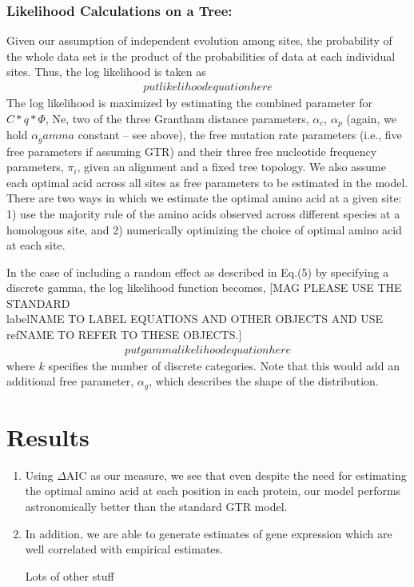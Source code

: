 \documentclass{article}
\newcommand{\DeltaAIC}{\ensuremath{\Delta\text{AIC}}\xspace}
\begin{document}
\subsubsection*{Likelihood Calculations on a Tree: }
Given our assumption of independent evolution among sites, the probability of the whole data set is the product of the probabilities of data at each individual sites.
Thus, the log likelihood is taken as 
\begin{align*}
put likelihood equation here
\end{align*}
The log likelihood is maximized by estimating the combined parameter for $C*q*\Phi$, Ne, two of the three Grantham distance parameters, $\alpha_c$, $\alpha_p$ (again, we hold $\alpha_gamma$ constant -- see above), the free mutation rate parameters (i.e., five free parameters if assuming GTR) and their three free nucleotide frequency parameters, $\pi_i$, given an alignment and a fixed tree topology.
We also assume each optimal acid across all sites as free parameters to be estimated in the model.
There are two ways in which we estimate the optimal amino acid at a given site: 1) use the majority rule of the amino acids observed across different species at a homologous site, and 2) numerically optimizing the choice of optimal amino acid at each site. 

In the case of including a random effect as described in Eq.(5) by specifying a discrete gamma, the log likelihood function becomes, 
[MAG PLEASE USE THE STANDARD \\label{NAME} TO LABEL EQUATIONS AND OTHER OBJECTS AND USE \\ref{NAME} TO REFER TO THESE OBJECTS.] 
\begin{align*}
put gamma likelihood equation here
\end{align*}
where $k$ specifies the number of discrete categories.
Note that this would add an additional free parameter, $\alpha_g$, which describes the shape of the distribution.


\section*{Results}
\begin{enumerate}
\item Using \DeltaAIC as our measure, we see that even despite the need for estimating the optimal amino acid at each position in each protein, our model performs astronomically better than the standard GTR model.
\item In addition, we are able to generate estimates of gene expression which are well correlated with empirical estimates.
\item [Lots of other stuff]
\end{enumerate}
\end{document}
